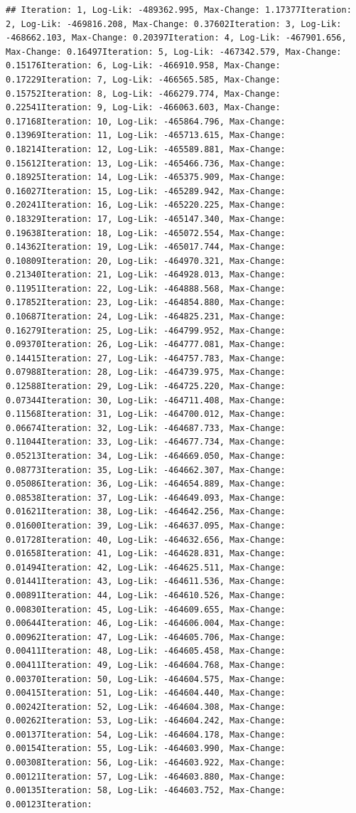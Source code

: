 \documentclass[
  man]{apa6}
\begin{document}
\begin{verbatim}
## Iteration: 1, Log-Lik: -489362.995, Max-Change: 1.17377Iteration: 2, Log-Lik: -469816.208, Max-Change: 0.37602Iteration: 3, Log-Lik: -468662.103, Max-Change: 0.20397Iteration: 4, Log-Lik: -467901.656, Max-Change: 0.16497Iteration: 5, Log-Lik: -467342.579, Max-Change: 0.15176Iteration: 6, Log-Lik: -466910.958, Max-Change: 0.17229Iteration: 7, Log-Lik: -466565.585, Max-Change: 0.15752Iteration: 8, Log-Lik: -466279.774, Max-Change: 0.22541Iteration: 9, Log-Lik: -466063.603, Max-Change: 0.17168Iteration: 10, Log-Lik: -465864.796, Max-Change: 0.13969Iteration: 11, Log-Lik: -465713.615, Max-Change: 0.18214Iteration: 12, Log-Lik: -465589.881, Max-Change: 0.15612Iteration: 13, Log-Lik: -465466.736, Max-Change: 0.18925Iteration: 14, Log-Lik: -465375.909, Max-Change: 0.16027Iteration: 15, Log-Lik: -465289.942, Max-Change: 0.20241Iteration: 16, Log-Lik: -465220.225, Max-Change: 0.18329Iteration: 17, Log-Lik: -465147.340, Max-Change: 0.19638Iteration: 18, Log-Lik: -465072.554, Max-Change: 0.14362Iteration: 19, Log-Lik: -465017.744, Max-Change: 0.10809Iteration: 20, Log-Lik: -464970.321, Max-Change: 0.21340Iteration: 21, Log-Lik: -464928.013, Max-Change: 0.11951Iteration: 22, Log-Lik: -464888.568, Max-Change: 0.17852Iteration: 23, Log-Lik: -464854.880, Max-Change: 0.10687Iteration: 24, Log-Lik: -464825.231, Max-Change: 0.16279Iteration: 25, Log-Lik: -464799.952, Max-Change: 0.09370Iteration: 26, Log-Lik: -464777.081, Max-Change: 0.14415Iteration: 27, Log-Lik: -464757.783, Max-Change: 0.07988Iteration: 28, Log-Lik: -464739.975, Max-Change: 0.12588Iteration: 29, Log-Lik: -464725.220, Max-Change: 0.07344Iteration: 30, Log-Lik: -464711.408, Max-Change: 0.11568Iteration: 31, Log-Lik: -464700.012, Max-Change: 0.06674Iteration: 32, Log-Lik: -464687.733, Max-Change: 0.11044Iteration: 33, Log-Lik: -464677.734, Max-Change: 0.05213Iteration: 34, Log-Lik: -464669.050, Max-Change: 0.08773Iteration: 35, Log-Lik: -464662.307, Max-Change: 0.05086Iteration: 36, Log-Lik: -464654.889, Max-Change: 0.08538Iteration: 37, Log-Lik: -464649.093, Max-Change: 0.01621Iteration: 38, Log-Lik: -464642.256, Max-Change: 0.01600Iteration: 39, Log-Lik: -464637.095, Max-Change: 0.01728Iteration: 40, Log-Lik: -464632.656, Max-Change: 0.01658Iteration: 41, Log-Lik: -464628.831, Max-Change: 0.01494Iteration: 42, Log-Lik: -464625.511, Max-Change: 0.01441Iteration: 43, Log-Lik: -464611.536, Max-Change: 0.00891Iteration: 44, Log-Lik: -464610.526, Max-Change: 0.00830Iteration: 45, Log-Lik: -464609.655, Max-Change: 0.00644Iteration: 46, Log-Lik: -464606.004, Max-Change: 0.00962Iteration: 47, Log-Lik: -464605.706, Max-Change: 0.00411Iteration: 48, Log-Lik: -464605.458, Max-Change: 0.00411Iteration: 49, Log-Lik: -464604.768, Max-Change: 0.00370Iteration: 50, Log-Lik: -464604.575, Max-Change: 0.00415Iteration: 51, Log-Lik: -464604.440, Max-Change: 0.00242Iteration: 52, Log-Lik: -464604.308, Max-Change: 0.00262Iteration: 53, Log-Lik: -464604.242, Max-Change: 0.00137Iteration: 54, Log-Lik: -464604.178, Max-Change: 0.00154Iteration: 55, Log-Lik: -464603.990, Max-Change: 0.00308Iteration: 56, Log-Lik: -464603.922, Max-Change: 0.00121Iteration: 57, Log-Lik: -464603.880, Max-Change: 0.00135Iteration: 58, Log-Lik: -464603.752, Max-Change: 0.00123Iteration: 
\end{verbatim}
\end{document}
